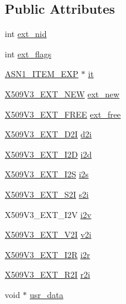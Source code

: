 \subsection*{Public Attributes}
\begin{DoxyCompactItemize}
\item 
int \hyperlink{structv3__ext__method_ad9f39327ffdb8ffb8cfdbea5a3081600}{ext\+\_\+nid}
\item 
int \hyperlink{structv3__ext__method_aa3e784b4aad755aa1c7d3b21b14d68d8}{ext\+\_\+flags}
\item 
\hyperlink{asn1_8h_a66f9dbfa70a439af388cb82e0c764944}{A\+S\+N1\+\_\+\+I\+T\+E\+M\+\_\+\+E\+XP} $\ast$ \hyperlink{structv3__ext__method_a6f57d2623c9652447056936691e7325f}{it}
\item 
\hyperlink{x509v3_8h_a255bf4524403cff63430307645b68985}{X509\+V3\+\_\+\+E\+X\+T\+\_\+\+N\+EW} \hyperlink{structv3__ext__method_a91b49ad85108d38d4acad8a29562c433}{ext\+\_\+new}
\item 
\hyperlink{x509v3_8h_a90f00f10cb7c7d69c4a3336dbf3eb928}{X509\+V3\+\_\+\+E\+X\+T\+\_\+\+F\+R\+EE} \hyperlink{structv3__ext__method_ac5cc2cd14dacbf0cefad5daa6481ee53}{ext\+\_\+free}
\item 
\hyperlink{x509v3_8h_a0d79955e9e105fccc4985343548869a4}{X509\+V3\+\_\+\+E\+X\+T\+\_\+\+D2I} \hyperlink{structv3__ext__method_affd83034cb2127f5c95827e92532d7da}{d2i}
\item 
\hyperlink{x509v3_8h_a084b8f42dff2d2f3104361d42b22cd87}{X509\+V3\+\_\+\+E\+X\+T\+\_\+\+I2D} \hyperlink{structv3__ext__method_af61d993d88060b09737ed999339817f5}{i2d}
\item 
\hyperlink{x509v3_8h_a7b4db93570d42537214f56beef17e7dd}{X509\+V3\+\_\+\+E\+X\+T\+\_\+\+I2S} \hyperlink{structv3__ext__method_ae6b9e63922dfd426a4bd8cda4c8719a5}{i2s}
\item 
\hyperlink{x509v3_8h_a3827378893f7d566cfbbd6d25d2b7abf}{X509\+V3\+\_\+\+E\+X\+T\+\_\+\+S2I} \hyperlink{structv3__ext__method_afe843df7c11d126f43aa7ed05538d572}{s2i}
\item 
X509\+V3\+\_\+\+E\+X\+T\+\_\+\+I2V \hyperlink{structv3__ext__method_a93b334b99719e183e3d16ea9c7c2547c}{i2v}
\item 
\hyperlink{x509v3_8h_a34d9ce77dea8bd4dfb324eaa6fee22be}{X509\+V3\+\_\+\+E\+X\+T\+\_\+\+V2I} \hyperlink{structv3__ext__method_ab0699c47258c61200f7189fe888f7aab}{v2i}
\item 
\hyperlink{x509v3_8h_a181236e0cb96bbf76e09b77d613d1f5e}{X509\+V3\+\_\+\+E\+X\+T\+\_\+\+I2R} \hyperlink{structv3__ext__method_aa61cb3a7c7bfe70f813857485e9a4e02}{i2r}
\item 
\hyperlink{x509v3_8h_a29947d7c833105793781ce3edeb15f6b}{X509\+V3\+\_\+\+E\+X\+T\+\_\+\+R2I} \hyperlink{structv3__ext__method_a58e1a54a66185f358d7859e771a9a39a}{r2i}
\item 
void $\ast$ \hyperlink{structv3__ext__method_a9a1b284354290f1f8d5d375a194c75e6}{usr\+\_\+data}
\end{DoxyCompactItemize}


